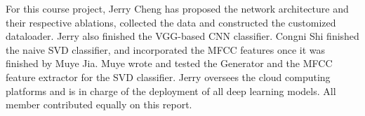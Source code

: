 \begin{par}
    For this course project, Jerry Cheng has proposed the network architecture and their respective ablations, collected the data and constructed the customized dataloader. Jerry also finished the VGG-based CNN classifier. Congni Shi finished the naive SVD classifier, and incorporated the MFCC features once it was finished by Muye Jia. Muye wrote and tested the Generator and the MFCC feature extractor for the SVD classifier. Jerry oversees the cloud computing platforms and is in charge of the deployment of all deep learning models. All member contributed equally on this report. 
\end{par}
